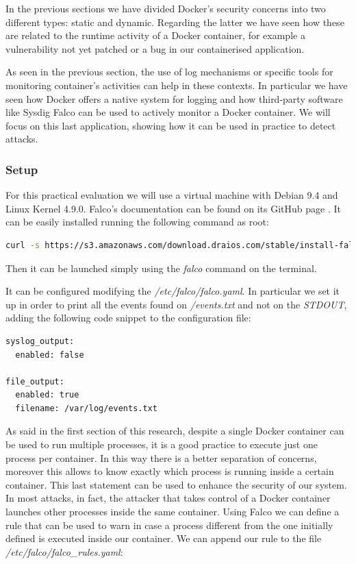 \documentclass[a4paper,12pt]{article}
\begin{document}
In the previous sections we have divided Docker's security concerns into two
different types: static and dynamic. Regarding the latter we have seen how these
are related to the runtime activity of a Docker container, for example a
vulnerability not yet patched or a bug in our containerised application. \par As
seen in the previous section, the use of log mechanisms or specific tools for
monitoring container's activities can help in these contexts. In particular we
have seen how Docker offers a native system for logging and how third-party
software like Sysdig Falco can be used to actively monitor a Docker container.
We will focus on this last application, showing how it can be used in practice
to detect attacks. 

\subsubsection{Setup}

For this practical evaluation we will use a virtual machine with Debian 9.4 and
Linux Kernel 4.9.0. Falco's documentation can be found on its GitHub page
\cite{falco_doc}. It can be easily installed running the following command as
root:
\begin{lstlisting}[language=bash,breaklines]
curl -s https://s3.amazonaws.com/download.draios.com/stable/install-falco | sudo bash
\end{lstlisting}
Then it can be launched simply using the \textit{falco} command on the
terminal. \par It can be configured modifying the
\textit{/etc/falco/falco.yaml}. In particular we set it up in order to print all
the events found on \textit{/events.txt} and not on the \textit{STDOUT}, adding
the following code snippet to the configuration file:
\begin{lstlisting}[language=bash,breaklines]
syslog_output:
  enabled: false

file_output:
  enabled: true
  filename: /var/log/events.txt
\end{lstlisting}
\par As said in the first section of this research, despite a single Docker
container can be used to run multiple processes, it is a good practice to
execute just one process per container. In this way there is a better separation
of concerns, moreover this allows to know exactly which process is running
inside a certain container. This last statement can be used to enhance the
security of our system. In most attacks, in fact, the attacker that takes
control of a Docker container launches other processes inside the same
container. Using Falco we can define a rule that can be used to warn in case a
process different from the one initially defined is executed inside our
container. We can append our rule to the file
\textit{/etc/falco/falco\_rules.yaml}:
\end{document}
